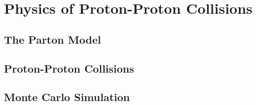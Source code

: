 \chapter{Physics of Proton-Proton Collisions}

\section{The Parton Model} \label{sec:pp_parton_model}

\section{Proton-Proton Collisions} \label{sec:pp_pp_collisions}


\section{Monte Carlo Simulation} \label{sec:pp_mc}
